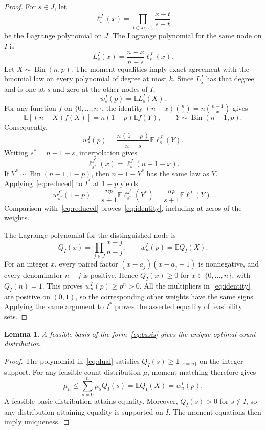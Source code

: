 \documentclass[11pt]{article}
\newtheorem{lemma}[theorem]{Lemma}
\theoremstyle{remark}
\newcommand{\E}{\mathbb E}
\newcommand{\Bin}{\operatorname{Bin}}
\begin{document}
\begin{proof}
For $s\in J$, let
\[
 \ell_s^J(x)=\prod_{t\in J\setminus\{s\}}\frac{x-t}{s-t}
\]
be the Lagrange polynomial on $J$. The Lagrange polynomial for the same node on $I$ is
\begin{equation}\label{eq:lagrange}
 L_s^I(x)=\frac{n-x}{n-s}\ell_s^J(x).
\end{equation}
Let $X\sim\Bin(n,p)$. The moment equalities imply exact agreement with the binomial law on every polynomial of degree at most $k$. Since $L_s^I$ has that degree and is one at $s$ and zero at the other nodes of $I$,
\begin{equation}\label{eq:expectation}
 w_s^I(p)=\E L_s^I(X).
\end{equation}
For any function $f$ on $\{0,\ldots,n\}$, the identity
$(n-x)\binom{n}{x}=n\binom{n-1}{x}$ gives
\begin{equation}\label{eq:reweight}
 \E[(n-X)f(X)]=n(1-p)\E f(Y),\qquad Y\sim\Bin(n-1,p).
\end{equation}
Consequently,
\begin{equation}\label{eq:reduced}
 w_s^I(p)=\frac{n(1-p)}{n-s}\E\ell_s^J(Y).
\end{equation}
Writing $s^*=n-1-s$, interpolation gives
\[
 \ell_{s^*}^{J^*}(x)=\ell_s^J(n-1-x).
\]
If $Y^*\sim\Bin(n-1,1-p)$, then $n-1-Y^*$ has the same law as $Y$. Applying~\eqref{eq:reduced} to $I^*$ at $1-p$ yields
\[
 w_{s^*}^{I^*}(1-p)
 =\frac{np}{s+1}\E\ell_{s^*}^{J^*}(Y^*)
 =\frac{np}{s+1}\E\ell_s^J(Y).
\]
Comparison with~\eqref{eq:reduced} proves~\eqref{eq:identity}, including at zeros of the weights.

The Lagrange polynomial for the distinguished node is
\begin{equation}\label{eq:dual}
 Q_I(x)=\prod_{j\in J}\frac{x-j}{n-j},\qquad
 w_n^I(p)=\E Q_I(X).
\end{equation}
For an integer $x$, every paired factor $(x-a_j)(x-a_j-1)$ is nonnegative, and every denominator $n-j$ is positive. Hence $Q_I(x)\ge0$ for $x\in\{0,\ldots,n\}$, with $Q_I(n)=1$. This proves $w_n^I(p)\ge p^n>0$.
All the multipliers in~\eqref{eq:identity} are positive on $(0,1)$, so the corresponding other weights have the same signs. Applying the same argument to $I^*$ proves the asserted equality of feasibility sets.
\end{proof}

\begin{lemma}\label{lem:optimal}
A feasible basis of the form~\eqref{eq:basis} gives the unique optimal count distribution.
\end{lemma}
\begin{proof}
The polynomial in~\eqref{eq:dual} satisfies $Q_I(s)\ge\mathbf 1_{\{s=n\}}$ on the integer support. For any feasible count distribution $\mu$, moment matching therefore gives
\[
 \mu_n\le\sum_{s=0}^n\mu_sQ_I(s)=\E Q_I(X)=w_n^I(p).
\]
A feasible basic distribution attains equality. Moreover, $Q_I(s)>0$ for $s\notin I$, so any distribution attaining equality is supported on $I$. The moment equations then imply uniqueness.
\end{proof}
\end{document}
